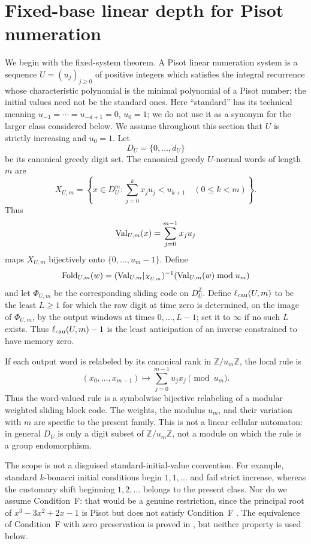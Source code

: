 \section{Fixed-base linear depth for Pisot numeration}
\label{sec:pisot-linear-depth}

We begin with the fixed-system theorem.  A Pisot linear numeration system is
a sequence $U=(u_j)_{j\ge0}$ of positive integers
which satisfies the integral recurrence whose characteristic polynomial is
the minimal polynomial of a Pisot number; the initial values need not be the
standard ones.  Here ``standard'' has its technical meaning
$u_{-1}=\cdots=u_{-d+1}=0$, $u_0=1$; we do not use it as a synonym for the
larger class considered below.  We assume throughout this section that $U$
is strictly increasing and $u_0=1$.  Let
\[
D_U=\{0,\ldots,d_U\}
\]
be its canonical greedy digit set.  The canonical greedy $U$-normal words of
length $m$ are
\begin{equation}
X_{U,m}=\left\{x\in D_U^m:
 \sum_{j=0}^k x_ju_j<u_{k+1}\quad(0\le k<m)\right\}.
\label{eq:pisot-canonical-words}
\end{equation}
Thus
\[
\mathrm{Val}_{U,m}(x)=\sum_{j=0}^{m-1}x_ju_j
\]
maps $X_{U,m}$ bijectively onto $\{0,\ldots,u_m-1\}$.  Define
\begin{equation}
\mathrm{Fold}_{U,m}(w)=
(\mathrm{Val}_{U,m}|_{X_{U,m}})^{-1}
       (\mathrm{Val}_{U,m}(w)\bmod u_m)
\label{eq:pisot-canonical-fold}
\end{equation}
and let $\Phi_{U,m}$ be the corresponding sliding code on
$D_U^{\mathbb Z}$.  Define $\ell_{\rm cau}(U,m)$ to be the least $L\ge1$ for
which the raw digit at time zero is determined, on the image of
$\Phi_{U,m}$, by the output windows at times $0,\ldots,L-1$; set it to
$\infty$ if no such $L$ exists.  Thus $\ell_{\rm cau}(U,m)-1$ is the least
anticipation of an inverse constrained to have memory zero.

If each output word is relabeled by its canonical rank in
$\mathbb Z/u_m\mathbb Z$, the local rule is
\[
(x_0,\ldots,x_{m-1})\longmapsto
\sum_{j=0}^{m-1}u_jx_j\pmod {u_m}.
\]
Thus the word-valued rule is a symbolwise bijective relabeling of a modular
weighted sliding block code.  The weights, the modulus $u_m$, and their
variation with $m$ are specific to the present family.  This is not a linear
cellular automaton: in general $D_U$ is only a digit subset of
$\mathbb Z/u_m\mathbb Z$, not a module on which the rule is a group
endomorphism.

The scope is not a disguised standard-initial-value convention.  For
example, standard $k$-bonacci initial conditions begin $1,1,\ldots$ and fail
strict increase, whereas the customary shift beginning $1,2,\ldots$ belongs
to the present class.  Nor do we assume Condition~F: that would be a genuine
restriction, since the principal root of $x^3-3x^2+2x-1$ is Pisot but does
not satisfy Condition~F \cite[Theorem~3]{Akiyama2000}.  The equivalence of
Condition~F with zero preservation is proved in
\cite{CartonSudberyYassawi2026}, but neither property is used below.


